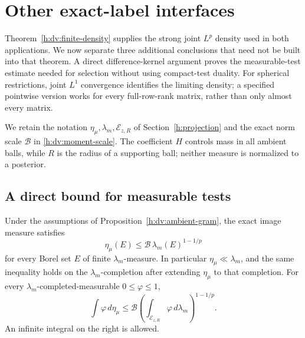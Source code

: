 \section{Other exact-label interfaces}
\label{h:dv:section}

Theorem~\ref{h:dv:finite-density} supplies the strong joint \(L^p\)
density used in both applications. We now separate three additional
conclusions that need not be built into that theorem. A direct
difference-kernel argument proves the measurable-test estimate needed
for selection without using compact-test duality. For spherical
restrictions, joint \(L^1\) convergence identifies the limiting density;
a specified pointwise version works for every full-row-rank matrix,
rather than only almost every matrix.

We retain the notation \(\eta_\mu,\lambda_m,\mathcal E_{z,R}\) of
Section~\ref{h:projection} and the exact norm scale \(\mathcal B\)
in \eqref{h:dv:moment-scale}. The coefficient \(H\) controls mass in
all ambient balls, while \(R\) is the radius of a supporting ball;
neither measure is normalized to a posterior.

\subsection{A direct bound for measurable tests}

\begin{proposition}
\label{h:dv:measurable-test}
Under the assumptions of Proposition~\ref{h:dv:ambient-gram}, the
exact image measure satisfies
\begin{equation}
 \eta_\mu(E)\le \mathcal B\,\lambda_m(E)^{1-1/p}
 \label{h:dv:set-bound}
\end{equation}
for every Borel set \(E\) of finite \(\lambda_m\)-measure.  In
particular \(\eta_\mu\ll\lambda_m\), and the same inequality holds on
the \(\lambda_m\)-completion after extending \(\eta_\mu\) to that
completion.  For every \(\lambda_m\)-completed-measurable
\(0\le\varphi\le1\),
\begin{equation}
 \int\varphi\,d\eta_\mu
 \le\mathcal B
 \left(\int_{\mathcal E_{z,R}}\varphi\,d\lambda_m\right)^{1-1/p}.
 \label{h:dv:test-bound}
\end{equation}
An infinite integral on the right is allowed.
\end{proposition}

